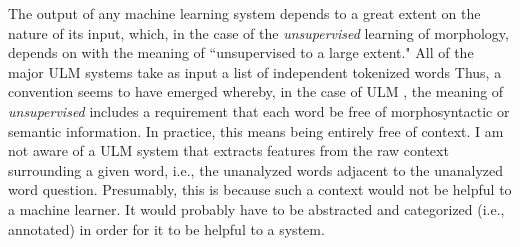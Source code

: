 The output of any machine learning system depends to 
a great extent on the nature of its input, which, in the case of the 
\emph{unsupervised} learning of morphology, 
depends on with the meaning of ``unsupervised to a large extent." 
All of the major \ac{ULM}  
systems take as input a list of independent tokenized words 
\citep[e.g.,][]{goldsmith:2001,baroni-et-al:2002,creutz-and-lagus:2005,poon-et-al:2009}
Thus, a convention seems to have emerged whereby, in the 
case of \ac{ULM} , the meaning of \emph{unsupervised} includes a
requirement that each word be free of morphosyntactic 
or semantic information. In practice,
this means being entirely free of context. I am 
not aware of a \ac{ULM} system that extracts features from the raw context surrounding a given word, i.e.,
the unanalyzed words adjacent to the unanalyzed word question. Presumably, this is because 
such a context would not be helpful to a machine learner. 
It would probably have to be abstracted and categorized 
(i.e., annotated) in order
for it to be helpful to a system. 

